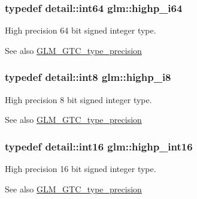 \subsubsection[{highp\+\_\+i64}]{\setlength{\rightskip}{0pt plus 5cm}typedef detail\+::int64 {\bf glm\+::highp\+\_\+i64}}\label{group__gtc__type__precision_gad3cb9a0ac0266ea2c51c6fac256345d1}
High precision 64 bit signed integer type. \begin{DoxySeeAlso}{See also}
\hyperlink{group__gtc__type__precision}{G\+L\+M\+\_\+\+G\+T\+C\+\_\+type\+\_\+precision} 
\end{DoxySeeAlso}
\hypertarget{group__gtc__type__precision_ga8b9eb0b24cce7f14478bfcacb53ce839}{}
\subsubsection[{highp\+\_\+i8}]{\setlength{\rightskip}{0pt plus 5cm}typedef detail\+::int8 {\bf glm\+::highp\+\_\+i8}}\label{group__gtc__type__precision_ga8b9eb0b24cce7f14478bfcacb53ce839}
High precision 8 bit signed integer type. \begin{DoxySeeAlso}{See also}
\hyperlink{group__gtc__type__precision}{G\+L\+M\+\_\+\+G\+T\+C\+\_\+type\+\_\+precision} 
\end{DoxySeeAlso}
\hypertarget{group__gtc__type__precision_gaf0430ed80e88c0d1dfbe47f359659c81}{}
\subsubsection[{highp\+\_\+int16}]{\setlength{\rightskip}{0pt plus 5cm}typedef {\bf detail\+::int16} {\bf glm\+::highp\+\_\+int16}}\label{group__gtc__type__precision_gaf0430ed80e88c0d1dfbe47f359659c81}
High precision 16 bit signed integer type. \begin{DoxySeeAlso}{See also}
\hyperlink{group__gtc__type__precision}{G\+L\+M\+\_\+\+G\+T\+C\+\_\+type\+\_\+precision} 
\end{DoxySeeAlso}
\hypertarget{group__gtc__type__precision_ga07d318d61472e75238e53b9642227672}{}
